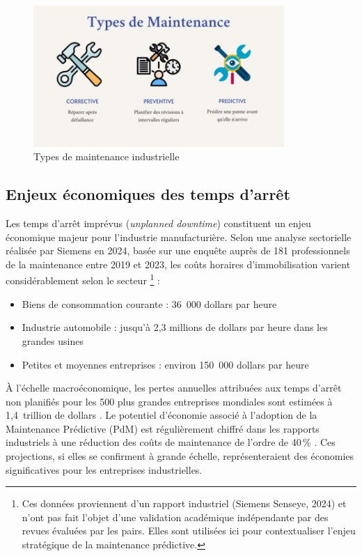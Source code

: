 \begin{figure}[ht]
\centering
\includegraphics[width=0.85\textwidth]{images/types-de-maintenance.jpg}
\caption{Types de maintenance industrielle}
\label{fig:maintenance_evolution}
\end{figure}

\subsection{Enjeux économiques des temps d'arrêt}

Les temps d'arrêt imprévus (\textit{unplanned downtime}) constituent un enjeu économique majeur pour l'industrie manufacturière. Selon une analyse sectorielle réalisée par Siemens en 2024, basée sur une enquête auprès de 181 professionnels de la maintenance entre 2019 et 2023, les coûts horaires d'immobilisation varient considérablement selon le secteur \cite{siemens2024}\footnote{Ces données proviennent d'un rapport industriel (Siemens Senseye, 2024) et n'ont pas fait l'objet d'une validation académique indépendante par des revues évaluées par les pairs. Elles sont utilisées ici pour contextualiser l'enjeu stratégique de la maintenance prédictive.} :

\begin{itemize}
\item Biens de consommation courante : 36~000 dollars par heure
\item Industrie automobile : jusqu'à 2,3 millions de dollars par heure dans les grandes usines
\item Petites et moyennes entreprises : environ 150~000 dollars par heure
\end{itemize}

À l'échelle macroéconomique, les pertes annuelles attribuées aux temps d'arrêt non planifiés pour les 500 plus grandes entreprises mondiales sont estimées à 1,4~trillion de dollars \cite{siemens2024}. Le potentiel d'économie associé à l'adoption de la Maintenance Prédictive (PdM) est régulièrement chiffré dans les rapports industriels à une réduction des coûts de maintenance de l'ordre de 40\,\% \cite{siemens2024}. Ces projections, si elles se confirment à grande échelle, représenteraient des économies significatives pour les entreprises industrielles.

